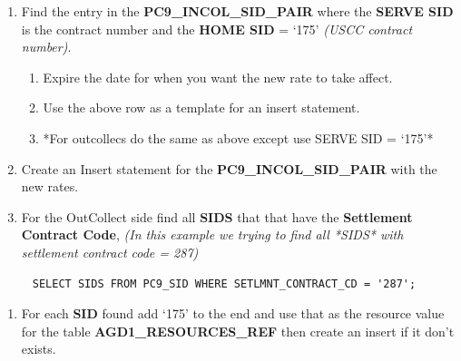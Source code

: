 \documentclass[12pt,twoside]{article}
\begin{document}
\begin{enumerate}
\item Find the entry in the \textbf{PC9\_INCOL\_SID\_PAIR} where the \textbf{SERVE SID} is the contract number and the \textbf{HOME SID} = `175' \emph{(USCC contract number)}.
\begin{enumerate}
\item Expire the date for when you want the new rate to take affect.
\item Use the above row as a template for an insert statement.
\item *For outcollecs do the same as above except use SERVE SID = `175'*
\end{enumerate}
\item Create an Insert statement for the  \textbf{PC9\_INCOL\_SID\_PAIR} with the new rates.
\item For the OutCollect side find all \textbf{SIDS} that that have the \textbf{Settlement Contract Code}, \emph{(In this example we trying to find all *SIDS* with settlement contract code = 287)}
\end{enumerate}
\begin{verbatim}
     SELECT SIDS FROM PC9_SID WHERE SETLMNT_CONTRACT_CD = '287';
\end{verbatim}
\begin{enumerate}
\item For each \textbf{SID} found add `175' to the end and use that as the resource value for the table \textbf{AGD1\_RESOURCES\_REF} then create an insert if it don't exists.
\end{enumerate}
   \footnotesize
\end{document}
